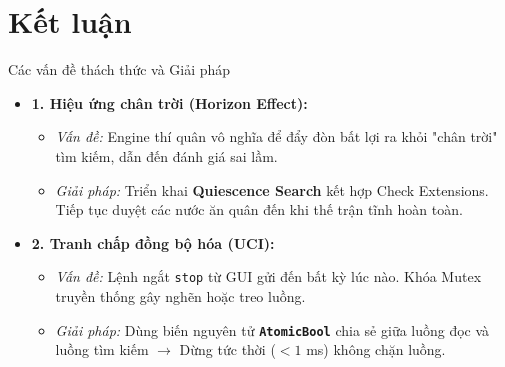 \section{Kết luận}
\begin{frame}{Các vấn đề thách thức và Giải pháp}
    \begin{itemize}
        \item<1-> \textbf{1. Hiệu ứng chân trời (Horizon Effect):}
        \begin{itemize}
            \item \textit{Vấn đề:} Engine thí quân vô nghĩa để đẩy đòn bất lợi ra khỏi "chân trời" tìm kiếm, dẫn đến đánh giá sai lầm.
            \item \textit{Giải pháp:} Triển khai \textbf{Quiescence Search} kết hợp Check Extensions. Tiếp tục duyệt các nước ăn quân đến khi thế trận tĩnh hoàn toàn.
        \end{itemize}
        
        \item<2-> \textbf{2. Tranh chấp đồng bộ hóa (UCI):}
        \begin{itemize}
            \item \textit{Vấn đề:} Lệnh ngắt \texttt{stop} từ GUI gửi đến bất kỳ lúc nào. Khóa Mutex truyền thống gây nghẽn hoặc treo luồng.
            \item \textit{Giải pháp:} Dùng biến nguyên tử \textbf{\texttt{AtomicBool}} chia sẻ giữa luồng đọc và luồng tìm kiếm $\rightarrow$ Dừng tức thời ($<1$ ms) không chặn luồng.
        \end{itemize}
    \end{itemize}
\end{frame}

